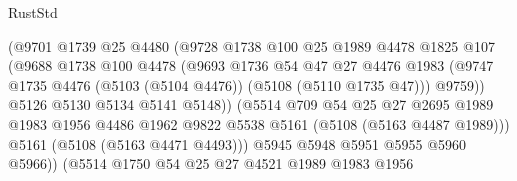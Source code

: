 \begin{lexlean}{RustStd}
\begin{coremodule}
                              (@9701
                                @1739
                                @25
                                @4480
                                (@9728
                                  @1738
                                  @100
                                  @25
                                  @1989
                                  @4478
                                  @1825
                                  @107
                                  (@9688
                                    @1738
                                    @100
                                    @4478
                                    (@9693
                                      @1736
                                      @54
                                      @47
                                      @27
                                      @4476
                                      @1983
                                      (@9747
                                        @1735
                                        @4476
                                        (@5103 (@5104 @4476))
                                        (@5108 (@5110 @1735 @47)))
                                      @9759))
                                  @5126
                                  @5130
                                  @5134
                                  @5141
                                  @5148))
                              (@5514
                                @709
                                @54
                                @25
                                @27
                                @2695
                                @1989
                                @1983
                                @1956
                                @4486
                                @1962
                                @9822
                                @5538
                                @5161
                                (@5108 (@5163 @4487 @1989)))
                              @5161
                              (@5108 (@5163 @4471 @4493)))
                            @5945
                            @5948
                            @5951
                            @5955
                            @5960
                            @5966))
                        (@5514
                          @1750
                          @54
                          @25
                          @27
                          @4521
                          @1989
                          @1983
                          @1956

\end{coremodule}
\end{lexlean}
